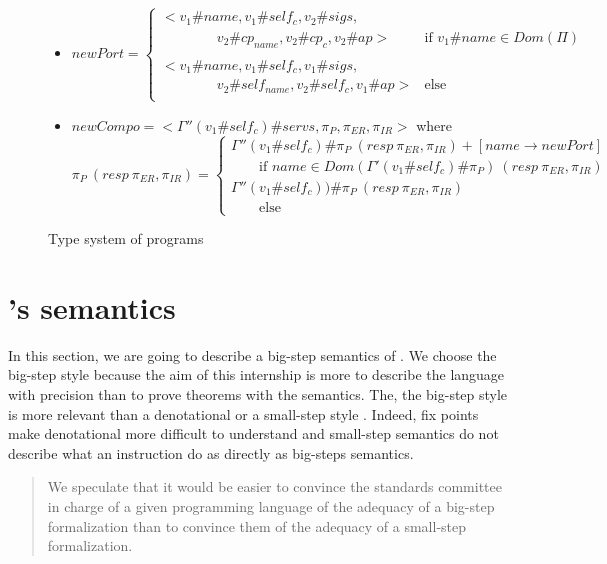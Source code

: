 \begin{figure}[ht!]
{{\begin{itemize}
\item $newPort = \begin{cases}<v_1\#name,v_1\#self_c,v_2\#sigs,&\\
\qquad \qquad  v_2\#cp_{name}, v_2\#cp_c,v_2\#ap>& \text{if }v_1\#name \in Dom(\Pi)\\
\\
<v_1\#name,v_1\#self_c,v_1\#sigs,&\\
\qquad \qquad  v_2\#self_{name}, v_2\#self_c,v_1\#ap>& \text{else}\\




\end{cases} $
\item $newCompo = <\Gamma''(v_1\#self_c)\#servs,\pi_P,\pi_{ER}, \pi_{IR}>$
where \[\pi_P~(resp~\pi_{ER},\pi_{IR})= \begin{cases}
\Gamma''(v_1\#self_c)\#\pi_P~(resp~\pi_{ER},\pi_{IR}) + [name \rightarrow newPort]&\\
\qquad \text{if $name\in Dom(\Gamma'(v_1\#self_c)\#\pi_P)~(resp~\pi_{ER},\pi_{IR})$}&\\
\Gamma''(v_1\#self_c))\#\pi_P~(resp~\pi_{ER},\pi_{IR})\\ \qquad \text{else}
\end{cases}\]
\end{itemize}

}}
\caption{Type system of \compo{} programs}
\end{figure}








\chapter{\compo's semantics}
In this section, we are going to describe a big-step semantics of \compo{}. We choose the big-step style because the aim of this internship is more to describe the language with precision than to prove theorems with the semantics. The, the big-step style is more relevant than a denotational or a small-step style \cite{Cha13}. Indeed, fix points make denotational more difficult to understand and small-step semantics do not describe what an instruction do as directly as big-steps semantics.

\blockquote{We speculate that it would be easier to convince the standards committee in charge of a given programming language of the adequacy of a big-step formalization than to convince them of the adequacy of a small-step formalization.}{\cite{Cha13}}

